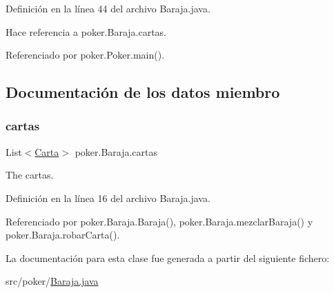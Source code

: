 Definición en la línea 44 del archivo Baraja.\+java.


\begin{DoxyCode}{0}

\end{DoxyCode}


Hace referencia a poker.\+Baraja.\+cartas.



Referenciado por poker.\+Poker.\+main().



\subsection{Documentación de los datos miembro}
\mbox{\label{classpoker_1_1Baraja_a267e10bf1a0fadd4b1bfa3f243fdfcf6}} 
\subsubsection{\texorpdfstring{cartas}{cartas}}
{\footnotesize\ttfamily List$<$\mbox{\hyperlink{classpoker_1_1Carta}{Carta}}$>$ poker.\+Baraja.\+cartas\hspace{0.3cm}{\ttfamily [private]}}



The cartas. 



Definición en la línea 16 del archivo Baraja.\+java.



Referenciado por poker.\+Baraja.\+Baraja(), poker.\+Baraja.\+mezclar\+Baraja() y poker.\+Baraja.\+robar\+Carta().



La documentación para esta clase fue generada a partir del siguiente fichero\+:\begin{DoxyCompactItemize}
\item 
src/poker/\mbox{\hyperlink{Baraja_8java}{Baraja.\+java}}\end{DoxyCompactItemize}
